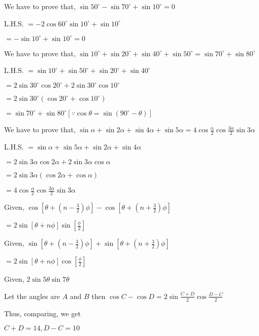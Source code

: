 \item We have to prove that, $\sin 50^\circ - \sin 70^\circ + \sin 10^\circ = 0$

  L.H.S. $= -2\cos 60^\circ \sin 10^\circ + \sin 10^\circ$

  $= -\sin10^\circ + \sin10^\circ = 0$

\item We have to prove that, $\sin 10^\circ + \sin 20^\circ + \sin 40^\circ + \sin 50^\circ = \sin 70^\circ + \sin 80^\circ$

  L.H.S. $= \sin 10^\circ + \sin 50^\circ + \sin 20^\circ + \sin 40^\circ$

  $= 2\sin 30^\circ \cos 20^\circ + 2\sin 30^\circ \cos 10^\circ$

  $= 2\sin30^\circ(\cos 20^\circ + \cos 10^\circ)$

  $= \sin 70^\circ + \sin 80^\circ[\because \cos\theta = \sin(90^\circ - \theta)]$

\item We have to prove that, $\sin\alpha + \sin 2\alpha + \sin 4\alpha + \sin 5\alpha = 4\cos \frac{\alpha}{2}\cos
  \frac{3\alpha}{2}\sin 3\alpha$

  L.H.S. $= \sin\alpha + \sin 5\alpha + \sin2\alpha + \sin4\alpha$

  $= 2\sin3\alpha\cos2\alpha + 2\sin3\alpha\cos\alpha$

  $= 2\sin3\alpha(\cos2\alpha + \cos\alpha)$

  $= 4\cos \frac{\alpha}{2}\cos \frac{3\alpha}{2}\sin 3\alpha$

\item Given, $\cos\left[\theta + \left(n - \frac{3}{2}\right)\phi\right] - \cos\left[\theta + \left(n +
  \frac{3}{2}\right)\phi\right]$

  $= 2\sin\left[\theta + n\phi\right]\sin\left[\frac{\phi}{2}\right]$

\item Given, $\sin\left[\theta + \left(n - \frac{3}{2}\right)\phi\right] + \sin\left[\theta + \left(n +
  \frac{3}{2}\right)\phi\right]$

  $= 2\sin\left[\theta + n\phi\right]\cos\left[\frac{\phi}{2}\right]$

\item Given, $2\sin5\theta\sin7\theta$

  Let the angles are $A$ and $B$ then $\cos C - \cos D = 2\sin \frac{C + D}{2}\cos\frac{D - C}{2}$

  Thus, comparing, we get

  $C + D = 14, D - C = 10$

